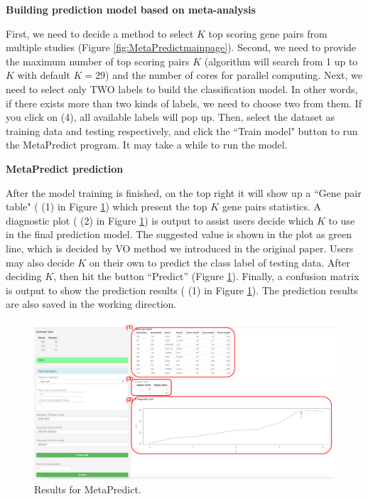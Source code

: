 \begin{steps}
\item \textbf{Building prediction model based on meta-analysis}

First, we need to decide a method to select $K$ top scoring gene pairs from multiple studies (Figure \ref{fig:MetaPredictmainpage}). 
Second, we need to provide the maximum number of top scoring pairs $K$ (algorithm will search from 1 up to $K$ with default $K = 29$) and the number of cores for parallel computing. 
Next, we need to select only TWO labels to build the classification model. 
In other words, if there exists more than two kinds of labels, we need to choose two from them. 
If you click on {\color{red} (4)}, all available labels will pop up.
Then, select the dataset as training data and testing respectively, 
and click the ``Train model" button to run the MetaPredict program. 
It may take a while to run the model.

\item \textbf{MetaPredict prediction}

After the model training is finished, on the top right it will show up a ``Gene pair table" ({\color{red} (1)} in Figure \ref{fig:MetaPredictresult}) which present the top $K$ gene pairs statistics. 
A diagnostic plot ({\color{red} (2)} in Figure \ref{fig:MetaPredictresult}) is output to assist users decide which $K$ to use in the final prediction model. 
The suggested value is shown in the plot as green line, which is decided by VO method we introduced in the original paper. Users may also decide $K$ on their own to predict the class label of testing data. 
After deciding $K$, then hit the button ``Predict'' (Figure \ref{fig:MetaPredictresult}). 
Finally, a confusion matrix is output to show the prediction results ({\color{red} (1)} in Figure \ref{fig:MetaPredictresult}).
The prediction results are also saved in the working direction.

\begin{figure}[H]
\begin{center}
\includegraphics[scale=0.5]{./figure/MetaPredict/MetaPredictresult.pdf}
\caption{Results for MetaPredict.}
\label{fig:MetaPredictresult}
\end{center}
\end{figure}

\end{steps}

